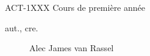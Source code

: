 \begin{contrib}{ACT-1XXX\: Cours de première année}
\begin{description}
	\item[aut., cre.] Alec James van Rassel
\end{description}
\end{contrib}